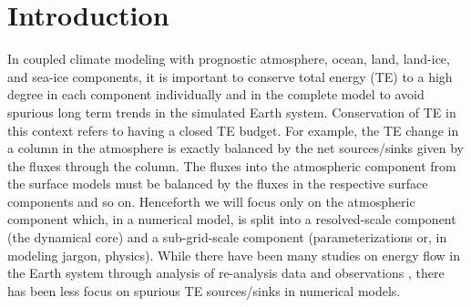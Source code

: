 \documentclass[draft,linenumbers]{agujournal}
\begin{document}
% 


%
% 
% 
% 


\section{Introduction}
In coupled climate modeling with prognostic atmosphere, ocean, land, land-ice, and sea-ice components, it is important to conserve total energy (TE) to a high degree in each component individually and in the complete model to avoid spurious long term trends in the simulated Earth system. Conservation of TE in this context refers to having a closed TE budget. For example, the TE change in a column in the atmosphere is exactly balanced by the net sources/sinks given by the fluxes through the column. The fluxes into the atmospheric component from the surface models must be balanced by the fluxes in the respective surface components and so on. Henceforth we will focus only on the atmospheric component which, in a numerical model, is split into a resolved-scale component (the dynamical core) and a sub-grid-scale component (parameterizations or, in modeling jargon, physics). While there have been many studies on energy flow in the Earth system through analysis of re-analysis data and observations \citep[][and references herein]{TF2018JC}, there has been less focus on spurious TE sources/sinks in numerical models.
\end{document}
